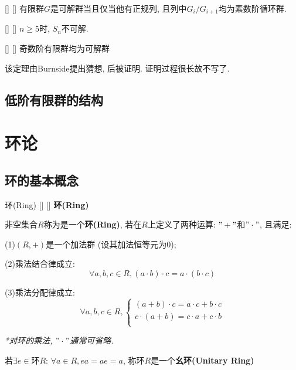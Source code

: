 \documentclass[UTF8]{ctexart}
\begin{document}
            \begin{ppt}
            []
            {}
            []
            []
                有限群$G$是可解群当且仅当他有正规列, 且列中$G_i/G_{i+1}$均为素数阶循环群.
           \end{ppt}

            \begin{thm}
            []
            {}
            []
            []
                $n\geq 5$时, $S_n$不可解.
           \end{thm}

            \begin{thm}
            []
            {}
            []
            []
                奇数阶有限群均为可解群
           \end{thm}
            该定理由Burnside提出猜想, 后被证明. 证明过程很长故不写了.
	\subsection{低阶有限群的结构}

\section{环论}

	\subsection{环的基本概念}
		
		\begin{dfn}
            []
            {环(Ring)}
            []
            []
			\textbf{环(Ring)}

			非空集合$R$称为是一个\textbf{环(Ring)}, 若在$R$上定义了两种运算: $"+"$和$"\cdot"$, 且满足: 
			
			(1)$(R,+)$是一个加法群 (设其加法恒等元为$0$); 

			(2)乘法结合律成立: 
			\[\forall a,b,c\in R, (a\cdot b)\cdot c=a\cdot(b\cdot c)\]
			
			(3)乘法分配律成立: 
			\[\forall a,b,c\in R, 
			\begin{cases}
				(a+b)\cdot c=a\cdot c+b\cdot c\\
				c\cdot (a+b)=c\cdot a+c\cdot b\\
			\end{cases}\]

			\textit{*对环的乘法, $"\cdot"$通常可省略. }

			若$\exists e\in$环$R$: $\forall a\in R, ea=ae=a$, 称环$R$是一个\textbf{幺环(Unitary Ring)}
		\end{dfn}
		
\end{document}
